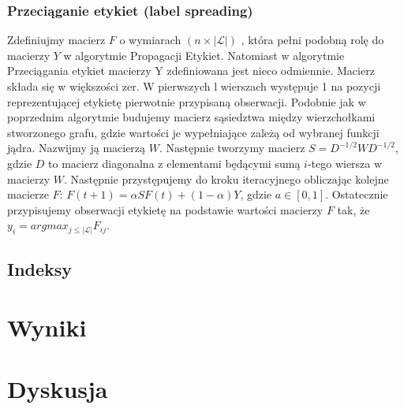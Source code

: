 \documentclass{article}
\begin{document}
\subsubsection{Przeciąganie etykiet (label spreading)}
Zdefiniujmy macierz \(F\) o wymiarach \((n \times |\mathcal{L}|)\) , która pełni podobną rolę do macierzy \(Y\) w algorytmie Propagacji Etykiet.
Natomiast w algorytmie Przeciągania etykiet macierzy Y zdefiniowana jest nieco odmiennie.
Macierz składa się w większości zer. W pierwszych l wierszach występuje 1 na pozycji reprezentującej etykietę pierwotnie przypisaną obserwacji.
Podobnie jak w poprzednim algorytmie budujemy macierz sąsiedztwa między wierzchołkami stworzonego grafu, gdzie wartości je wypełniające zależą od wybranej funkcji jądra.
Nazwijmy ją macierzą \(W\). 
Następnie tworzymy macierz \(S = D^{-1/2}WD^{-1/2}\), gdzie \(D\) to macierz diagonalna z elementami będącymi sumą \(i\)-tego wiersza w macierzy \(W\).
Następnie przystępujemy do kroku iteracyjnego obliczając kolejne macierze \(F\): \(F(t+1) = \alpha SF(t) + (1 - \alpha)Y\), gdzie \(a \in [0,1]\).
Ostatecznie przypisujemy obserwacji etykietę na podstawie wartości macierzy \(F\) tak, że \(y_i = argmax_{j\leqslant |\mathcal{L}|} F_{ij}\). 
\subsection{Indeksy}
\section{Wyniki}
\section{Dyskusja}



\end{document}
